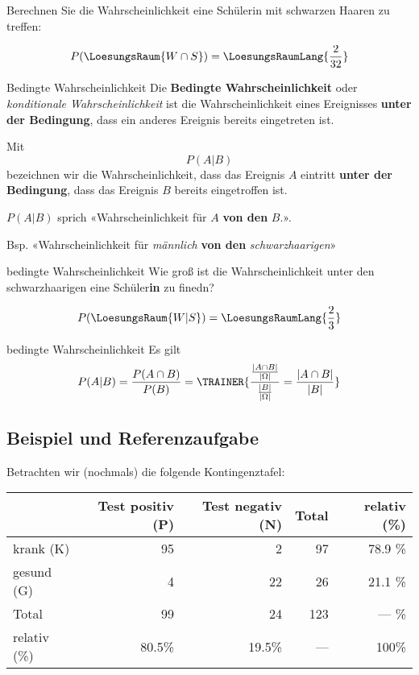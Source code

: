 Berechnen Sie die Wahrscheinlichkeit eine Schülerin mit schwarzen Haaren zu treffen:

\leserluft

$$P(\LoesungsRaum{W \cap S}) = \LoesungsRaumLang{\frac{2}{32}}$$

\newpage


\begin{definition}{Bedingte Wahrscheinlichkeit}{}
Die \textbf{Bedingte Wahrscheinlichkeit} oder \textit{konditionale
  Wahrscheinlichkeit} ist die Wahrscheinlichkeit eines Ereignisses
\textbf{unter der Bedingung}, dass ein anderes Ereignis bereits
eingetreten ist.

  Mit
  $$P(A | B)$$
  bezeichnen wir die Wahrscheinlichkeit, dass das Ereignis $A$
  eintritt \textbf{unter der Bedingung}, dass das Ereignis $B$ bereits
  eingetroffen ist.
\end{definition}

\begin{bemerkung}{}{}
  $P(A|B)$ sprich «Wahrscheinlichkeit für $A$ \textbf{von den} $B$.».

  Bsp. «Wahrscheinlichkeit für \textit{männlich} \textbf{von den} \textit{schwarzhaarigen}»  
\end{bemerkung}

\begin{beispiel}{bedingte Wahrscheinlichkeit}{}
  Wie groß ist die Wahrscheinlichkeit unter den schwarzhaarigen eine Schüler\textbf{in} zu finedn?

  \leserluft

  $$P(\LoesungsRaum{W|S})  = \LoesungsRaumLang{\frac23}$$
  \end{beispiel}

\begin{gesetz}{bedingte Wahrscheinlichkeit}{}
  Es gilt
  $$P(A|B) = \frac{P(A\cap B)}{P(B)} = \TRAINER{  \frac{\frac{|A\cap B|}{|\Omega|}}{\frac{|B|}{|\Omega|}}= \frac{|A\cap B|}{|B|}}$$
  
\end{gesetz}
\newpage

\subsection{Beispiel und Referenzaufgabe}
Betrachten wir (nochmals) die folgende Kontingenztafel:

  \begin{tabular}{|l|r|r|r|r|}\hline
                 & Test positiv (P) & Test negativ (N)& Total & relativ (\%) \\\hline
    krank (K)    & 95               & 2               & 97    & 78.9 \%      \\\hline    
    gesund (G)   & 4                & 22              & 26    & 21.1 \%      \\\hline
    Total        & 99               & 24              & 123   &  --- \%      \\\hline
    relativ (\%) & 80.5\%           &19.5\%           & ---   &   100\%      \\\hline
  \end{tabular}
  
